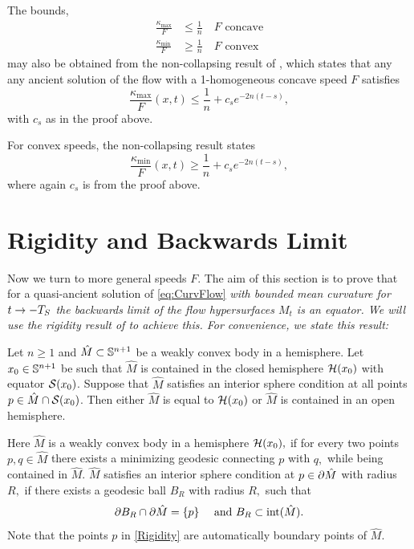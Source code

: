 \documentclass{amsart}
\begin{document}
\begin{rem}
The bounds, 
\[
\begin{split}
\frac{\kappa_{\max}}{F} &\leq \frac{1}{n} \quad \text{$F$ concave} \\
\frac{\kappa_{\min}}{F} &\geq \frac{1}{n} \quad \text{$F$ convex}
\end{split}
\]
may also be obtained from the non-collapsing result of \cite[Theorem 1.1]{AndrewsHanLiWei:/2015}, which states that any any ancient solution of the flow with a 1-homogeneous concave speed $F$ satisfies
\[
\frac{\kappa_{\max}}{F}(x,t) \leq \frac{1}{n}+c_se^{-2n(t-s)},
\]
with \(c_s\) as in the proof above.

For convex speeds, the non-collapsing result states
\[
\frac{\kappa_{\min}}{F}(x,t)\geq \frac{1}{n}+c_se^{-2n(t-s)},
\]
where again \(c_s\) is from the proof above.
\end{rem}

\section{Rigidity and Backwards Limit}\label{sec:rigidity}
Now we turn to more general speeds \(F\). The aim of this section is to prove that for a quasi-ancient solution of \eqref{eq:CurvFlow} \it{with bounded mean curvature} for $t\ra -T_S$ the backwards limit of the flow hypersurfaces $M_t$  is an equator. We will use the rigidity result of \cite{MakowskiScheuer:/2013} to achieve this. For convenience, we state this result:
\begin{thm}\label{Rigidity}\textsc{\cite[Theorem 1.1]{MakowskiScheuer:/2013}}
Let $ n\geq 1$ and $\hat{M}\subset \S^{n+1}$ be a weakly convex body in a hemisphere. Let $x_0\in \S^{n+1}$ be such that $\hat{M}$ is contained in the closed hemisphere $\mc{H}(x_0)$ with equator $\mc{S}(x_{0})$. Suppose that $\hat{M}$ satisfies an interior sphere condition at all points $p\in \hat{M} \cap \mc{S}(x_0)$. Then either $\hat{M}$ is equal to $\mc{H}(x_0)$ or $\hat{M}$ is contained in an open hemisphere.
\end{thm}
Here $\hat{M}$ is a weakly convex body in a hemisphere $\mc{H}(x_0),$ if for every two points $p,q\in\hat{M}$ there exists a minimizing geodesic connecting $p$ with $q,$ while being contained in $\hat{M}.$ $\hat{M}$ satisfies an interior sphere condition at $p\in \del\hat{M}$ with radius $R,$ if there exists a geodesic ball $B_R$ with radius $R,$ such that
\[\del B_R\cap\del \hat{M}=\{p\}\quad~\text{and}~B_R\sub\mrm{int}(\hat{M}). \]
Note that the points $p$ in \cref{Rigidity} are automatically boundary points of $\hat{M}.$
\end{document}
